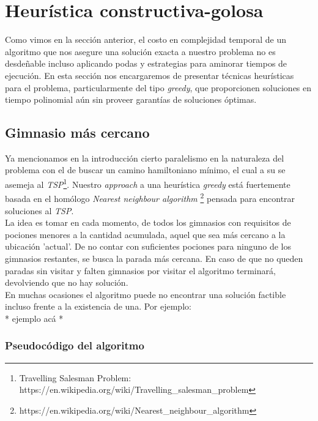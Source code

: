 \section{Heurística constructiva-golosa}
    Como vimos en la sección anterior, el costo en complejidad temporal de un algoritmo que nos asegure una solución exacta a nuestro problema no es desdeñable incluso aplicando podas y estrategias para aminorar tiempos de ejecución. En esta sección nos encargaremos de presentar técnicas heurísticas para el problema, particularmente del tipo \emph{greedy}, que proporcionen soluciones en tiempo polinomial aún sin proveer garantías de soluciones óptimas.

\subsection{Gimnasio más cercano}
    Ya mencionamos en la introducción cierto paralelismo en la naturaleza del problema con el de buscar un camino hamiltoniano mínimo, el cual a su se asemeja al \emph{TSP}\footnote{Travelling Salesman Problem: https://en.wikipedia.org/wiki/Travelling_salesman_problem}. Nuestro \emph{approach} a una heurística \emph{greedy} está fuertemente basada en el homólogo \emph{Nearest neighbour algorithm} \footnote{https://en.wikipedia.org/wiki/Nearest_neighbour_algorithm} pensada para encontrar soluciones al \emph{TSP}.
    \\

    La idea es tomar en cada momento, de todos los gimnasios con requisitos de pociones menores a la cantidad acumulada, aquel que sea más cercano a la ubicación 'actual'. De no contar con suficientes pociones para ninguno de los gimnasios restantes, se busca la parada más cercana. En caso de que no queden paradas sin visitar y falten gimnasios por visitar el algoritmo terminará, devolviendo que no hay solución.
    \\

    En muchas ocasiones el algoritmo puede no encontrar una solución factible incluso frente a la existencia de una. Por ejemplo:
    \\

    {\color{red} * ejemplo acá *}
    \\

\subsubsection{Pseudocódigo del algoritmo}

